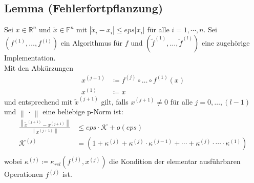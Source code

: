 \documentclass[ngerman,fontsize=11pt, paper=a4, parskip=half, titlepage=true, toc=bib]{scrbook}
\newcommand{\Ren}{\mathds{R}^{n}}
\newcommand{\F}{\mathds{F}}
\newcommand{\K}{\mathcal{K}}
\newcommand{\nn}[1]{\left\| #1 \right\|}
\begin{document}
\subsection{Lemma (Fehlerfortpflanzung)}\label{3.3.5} 
Sei $x\in \Ren$ und $\widetilde{x}\in \F^n$ mit $|\widetilde{x}_i-x_i|\leq eps|x_i|$ für alle 
$i=1,\cdots , n$.
Sei $\left(f^{(1)},\dotsc ,f^{(l)}\right)$ ein Algorithmus für $f$ und 
$(\widetilde{f}^{(1)},\dotsc ,\widetilde{f}^{(l)})$ eine zugehörige Implementation. \\
Mit den Abkürzungen
\begin{align*}
	x^{(j+1)} &\coloneqq f^{(j)}\circ \dotsc \circ f^{(1)}(x) \\
	x^{(1)} &\coloneqq x
\end{align*}
und entsprechend mit $\widetilde{x}^{(j+1)}$ gilt,
falls $x^{(j+1)} \neq 0$ für alle $j=0,\dotsc , (l-1)$ und $\nn{\,\cdot\,}$ eine beliebige p-Norm ist:
\begin{align}
	\frac{\nn{\widetilde{x}^{(j+1)}-x^{(j+1)}}}{\nn{x^{(j+1)}}}
	&\leq eps \cdot \K + o\left(eps\right)
	\label{III.3.4} 
	\\ \nonumber
	\K^{(j)}&=(1+\kappa^{(j)}+\kappa^{(j)}\cdot \kappa^{(j-1)}+ \cdots + \kappa^{(j)}\cdot \dotsm \cdot \kappa^{(1)}) \\ \nonumber
\end{align}
wobei $	\kappa^{(j)} \coloneqq \kappa_{rel}(f^{(j)}, x^{(j)})$ die Kondition der elementar ausführbaren Operationen $f^{(j)}$ ist.
\end{document}
